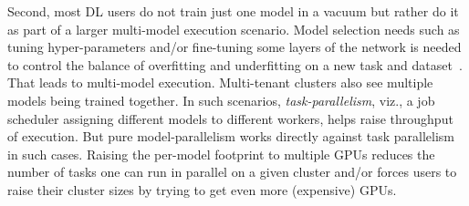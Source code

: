 \documentclass{article}
\begin{document}
Second, most DL users do not train just one model in a vacuum but rather do it as part of a larger multi-model execution scenario. Model selection needs such as tuning hyper-parameters and/or fine-tuning some layers of the network is needed to control the balance of overfitting and underfitting on a new task and dataset~\cite{understandingml}. That leads to multi-model execution. Multi-tenant clusters also see multiple models being trained together. In such scenarios, \textit{task-parallelism}, viz., a job scheduler assigning different models to different workers, helps raise throughput of execution. But pure model-parallelism works directly against task parallelism in such cases. Raising the per-model footprint to multiple GPUs reduces the number of tasks one can run in parallel on a given cluster and/or forces users to raise their cluster sizes by trying to get even more (expensive) GPUs.
\end{document}
